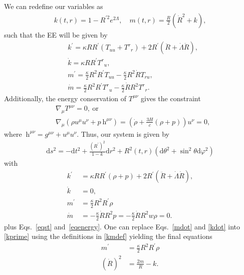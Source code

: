 \documentclass[a4paper,11pt]{article}
\begin{document}
We can redefine our variables as
\begin{align}
	\label{kmdef}
	k(t, r)=1-R^{\prime 2} e^{2 \Lambda}, \quad m(t, r)=\frac{R}{2}\left(\dot{R}^2+k\right)
	,\end{align}
such that the EE will be given by
\begin{align}
	 & k^{\prime} = \kappa RR^{\prime}\left(T_{uu}+T^{r}{}_{r}\right)+2R^{\prime}\left(\ddot{R}+\dot{\Lambda}\dot{R}\right), \\
	 & \dot{k} = \kappa RR^{\prime}T^{r}{}_{u},                                                                              \\
	 & m^{\prime} =\frac{\kappa}{2} R^{2}R^{\prime}T_{uu}-\frac{\kappa}{2} R^{2}\dot{R}T_{ru},                               \\
	 & \dot{m} =\frac{\kappa}{2} R^{2}R^{\prime}T^{r}{}_{u}-\frac{\kappa}{2}\dot{R}R^{2}T^{r}{}_{r}
	.\end{align}
Additionally, the energy conservation of $T^{\mu\nu}$ gives the constraint
\begin{align}
	\label{eqenergy}
	 & \nabla_{\mu}T^{\mu\nu}=0,~\text{or}\nonumber                                                           \\
	 & \nabla_\mu(\rho u^\mu u^\nu+p\mathrm{~h}^{\mu\nu})=\left(\dot{\rho}+\frac{3H}{c}(\rho+p)\right)u^\nu=0
	,\end{align}
where $\mathrm{~h}^{\mu\nu} = g^{\mu\nu} + u^\mu u^\nu $.
Thus, our system is given by
\begin{align}
	\label{metricgen}
	\mathrm{d} s^2=-\mathrm{d} t^2+\frac{(R^\prime)^{2}}{1 - k} \mathrm{d} r^2+R^2(t, r)\left(\mathrm{d} \theta^2+\sin ^2 \theta \mathrm{d} \varphi^2\right)
\end{align}
with
\begin{align}
	\label{kprime}
	k^{\prime} & =\kappa RR^{\prime}\left(\rho+p\right)+2R^{\prime}\left(\ddot{R}+\dot{\Lambda}\dot{R}\right), \\
	\label{kdot}
	\dot{k}    & = 0,                                                                                          \\
	m^{\prime} & =\frac{\kappa}{2} R^{2}R^{\prime}\rho                                                         \\
	\label{mdot}
	\dot{m}    & =-\frac{\kappa}{2}\dot{R}R^{2}p = -\frac{\kappa}{2}\dot{R}R^{2} w\rho = 0.
\end{align}
plus Eqs.~\eqref{eqst} and~\eqref{eqenergy}. One can replace Eqs.~\eqref{mdot} and
\eqref{kdot} into \eqref{kprime} using the definitions in \eqref{kmdef} yielding the
final equations
\begin{align}
	\label{mprime}
	m^{\prime}  & =\frac{\kappa}{2} R^{2}R^{\prime}\rho \\
	\label{rdot}
	(\dot{R})^2 & = \frac{2m}{R}-k
	.\end{align}
\end{document}
